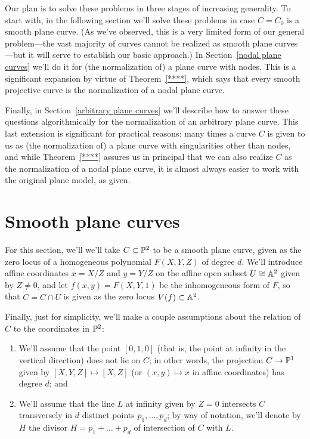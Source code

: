 Our plan is to solve these problems in three stages of increasing generality. To start with, in the following section we'll solve these problems in case $C = C_0$ is a smooth plane curve. (As we've observed, this is a very limited form of our general problem---the vast majority of curves cannot be realized as smooth plane curves---but it will serve to establish our basic approach.) In Section~\ref{nodal plane curves} we'll do it for (the normalization of) a plane curve with nodes. This is a significant expansion by virtue of Theorem~\ref{****}, which says that every smooth projective curve is the normalization of a nodal plane curve. 

Finally, in Section~\ref{arbitrary plane curves} we'll describe how to answer these questions algorithmically for the normalization of an arbitrary plane curve.
This last extension is significant for practical reasons: many times a curve $C$ is given to us as (the normalization of) a plane curve with singularities other than nodes, and while Theorem~\ref{****} assures us in principal that we can also realize $C$ as the normalization of a nodal plane curve, it is almost always easier to work with the original plane model, as given. 


\section{Smooth plane curves}\label{smooth plane curves}

For this section, we'll we'll take $C \subset \PP^2$ to be a smooth plane curve, given as the zero locus of a homogeneous polynomial $F(X,Y,Z)$ of degree $d$. We'll introduce affine coordinates $x = X/Z$ and $y = Y/Z$ on the affine open subset $U \cong \AA^2$ given by $Z \neq 0$, and let $f(x,y) = F(X,Y,1)$ be the inhomogeneous form of $F$, so that $\tilde C = C \cap U$ is given as the zero locus $V(f) \subset  \AA^2$. 

Finally, just for simplicity, we'll make a couple assumptions about the relation of $C$ to the coordinates in $\PP^2$:
\begin{enumerate}
\item We'll assume that the point $[0,1,0]$ (that is, the point at infinity in the vertical direction) does not lie on $C$; in other words, the projection $C \to \PP^1$ given by $[X,Y,Z] \mapsto [X,Z]$ (or $(x,y) \mapsto x$ in affine coordinates)  has degree $d$; and
\item We'll assume that the line $L$ at infinity given by $Z = 0$ intersects $C$ transversely in $d$ distinct points $p_1, \dots, p_d$; by way of notation, we'll denote by $H$ the divisor $H = p_1+ \dots +p_d$ of intersection of $C$ with $L$.
\end{enumerate}

